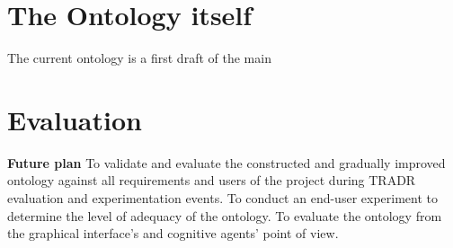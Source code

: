 \begin{itemize}
\begin{itemize}
\end{itemize}


\section{The Ontology itself}

The current ontology is a first draft of the main 

\section{Evaluation}



\textbf{Future plan}
To validate and evaluate the constructed and gradually improved ontology against all requirements and users of the project during TRADR evaluation and experimentation events. To conduct an end-user experiment to determine the level of adequacy of the ontology. To evaluate the ontology from the graphical interface's and cognitive agents' point of view.  

\end{itemize}
  
  
  
  
  
  